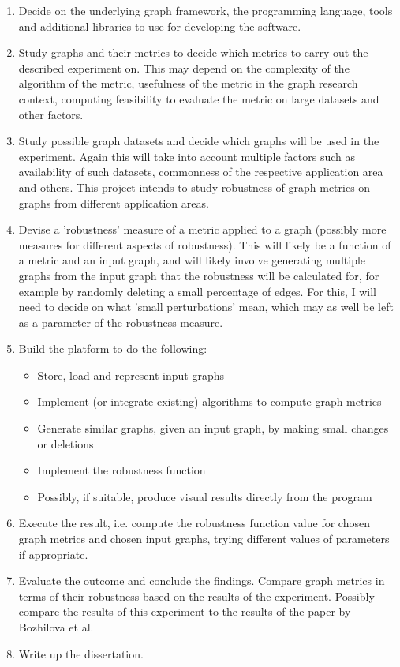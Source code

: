 \documentclass[12pt,a4paper,twoside]{article}
\begin{document}
	\begin{enumerate}
		
		\item Decide on the underlying graph framework, the programming language, tools and additional libraries to use for developing the software.
		
		\item Study graphs and their metrics to decide which metrics to carry out the described experiment on. This may depend on the complexity of the algorithm of the metric, usefulness of the metric in the graph research context, computing feasibility to evaluate the metric on large datasets and other factors.
		
		\item Study possible graph datasets and decide which graphs will be used in the experiment. Again this will take into account multiple factors such as availability of such datasets, commonness of the respective application area and others. This project intends to study robustness of graph metrics on graphs from different application areas.
		
		\item Devise a 'robustness' measure of a metric applied to a graph (possibly more measures for different aspects of robustness). This will likely be a function of a metric and an input graph, and will likely involve generating multiple graphs from the input graph that the robustness will be calculated for, for example by randomly deleting a small percentage of edges. For this, I will need to decide on what 'small perturbations' mean, which may as well be left as a parameter of the robustness measure.
		
		\item Build the platform to do the following:
		\begin{itemize}
		    \item Store, load and represent input graphs
		    \item Implement (or integrate existing) algorithms to compute graph metrics
		    \item Generate similar graphs, given an input graph, by making small changes or deletions
		    \item Implement the robustness function
		    \item Possibly, if suitable, produce visual results directly from the program
		\end{itemize}
		
		\item Execute the result, i.e. compute the robustness function value for chosen graph metrics and chosen input graphs, trying different values of parameters if appropriate.
		
		\item Evaluate the outcome and conclude the findings. Compare graph metrics in terms of their robustness based on the results of the experiment. Possibly compare the results of this experiment to the results of the paper by Bozhilova et al.
		
		\item Write up the dissertation.
		
	\end{enumerate}
	
\end{document}
